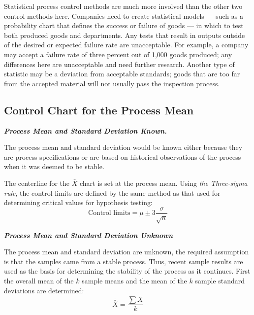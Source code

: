 \documentclass[12pt]{article}
\begin{document}

Statistical process control methods are much more involved than the other two control methods here. Companies need to create statistical models — such as a probability chart that defines the success or failure of goods — in which to test both produced goods and departments. Any tests that result in outputs outside of the desired or expected failure rate are unacceptable. For example, a company may accept a failure rate of three percent out of 1,000 goods produced; any differences here are unacceptable and need further research. Another type of statistic may be a deviation from acceptable standards; goods that are too far from the accepted material will not usually pass the inspection process.

\subsection{Control Chart for the Process Mean}

\textit{\textbf{Process Mean and Standard Deviation Known. }}

The process mean and standard deviation would be
known either because they are process specifications or are based on historical observations of the process when it was deemed to be stable. 

The centerline for the $\bar{X}$ chart is set at the process mean. Using \textit{the Three-sigma rule}, the
control limits are defined by the same method as that used for determining critical values for hypothesis testing:
\[ \mbox{Control limits} = \mu \pm 3\frac{\sigma}{\sqrt{n}} \]

\textit{\textbf{Process Mean and Standard Deviation Unknown}} 

The process mean and standard deviation are
unknown, the required assumption is that the samples came from a stable process. Thus, recent sample results
are used as the basis for determining the stability of the process as it continues. First the overall mean of the $k$
sample means and the mean of the $k$ sample standard deviations are determined:
\[ \bar{\bar{X}} = \frac{\sum \bar{X}}{k} \]
\end{document}
